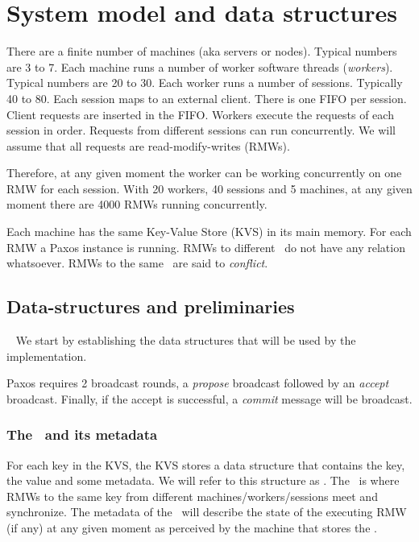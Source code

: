 \section{System model and data structures} \label{sec:prel}

There are a finite number of machines (aka servers or nodes). Typical numbers are 3 to 7. Each machine runs a number of worker software threads (\emph{workers}). Typical numbers are 20 to 30. Each worker runs a number of sessions. Typically 40 to 80. Each session maps to an external client. There is one FIFO per session. Client requests are inserted in the FIFO.
Workers execute the requests of each session in order. Requests from different sessions can run concurrently. We will assume that all requests are read-modify-writes (RMWs). 

Therefore, at any given moment the worker can be working concurrently on one RMW for each session.
With 20 workers, 40 sessions and 5 machines, at any given moment there are 4000 RMWs running concurrently. 


Each machine has the same Key-Value Store (KVS) in its main memory.
For each RMW a Paxos instance is running. RMWs to different \kvs\ do not have any relation whatsoever. RMWs to the same \kv\ are said to \emph{conflict}.

\subsection{Data-structures and preliminaries}~\label{sec:prel:data}
We start by establishing the data structures that will be used by the implementation.


\custvspace
{}
Paxos requires 2 broadcast rounds, a \emph{propose} broadcast followed by an \emph{accept} broadcast. Finally, if the accept is successful, a \emph{commit} message will be broadcast.


\subsubsection{The \kv~and its metadata}
\custvspace
\beginbsec{\kv}
For each key in the KVS, the KVS stores a data structure that contains the key, the value and some metadata. We will refer to this structure as \emph{\kv}. The \kv~is where RMWs to the same key from different machines/workers/sessions meet and synchronize. The metadata of the \kv\ will describe the state of the executing RMW (if any) at any given moment as perceived by the machine that stores the \kv.


